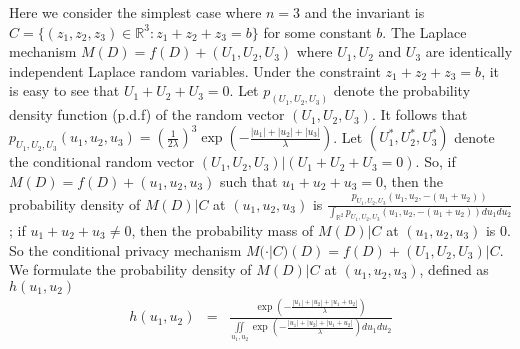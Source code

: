 \documentclass[11pt]{article}
\begin{document}
\begin{comment}
Here we demonstrate a form of mechanism design.  For simplicity, we assume that $M: \mathcal{D}\rightarrow \mathbb{R}^n$ is additive, i.e., $M(D)= f(D) + (U_1, U_2,\cdots, U_n) $ where $U_i's$ are i.i.d. random variables with density function $f_{U_i}$. The $M(D|C) = f(D) + (U_1, U_2, \cdots, U_n) |C$ where $(U_1, U_2, \cdots, U_n)|C $ is a random vector with the density function as follows:

\begin{equation*}
f_{(U_1, U_2, \cdots, U_n)|C} = \left\{
\begin{array}{rl}
\frac{f_{(U_1, U_2, \cdots, U_n)}}{K} & \text{if } M(D) \in C,\\
 0 & \text{if } otherwise.
\end{array} \right.
\end{equation*}
where $K = \int_C f_{(U_1, U_2, \cdots, U_n)} (u_1, u_2, \cdots, u_n) du_1u_2\cdots u_n$.
\end{comment}
 
Here we consider the simplest case where $n=3$ and the invariant is $C=\{(z_1,z_2,z_3)\in \mathbb{R}^3: z_1+ z_2 + z_3=b\}$ for some constant $b$.  The Laplace mechanism $M(D) = f(D) + (U_1, U_2, U_3)$ where $U_1, U_2$ and $U_3$ are identically independent Laplace random variables. Under the constraint  $z_1 + z_2 +z_3= b$, it is easy to see that $U_1+U_2+U_3=0$.
Let $p_{(U_1, U_2, U_3)}$ denote the probability density function (p.d.f) of the random vector $(U_1, U_2, U_3)$. It follows that $p_{U_1, U_2, U_3}(u_1, u_2, u_3) = (\frac{1}{2\lambda})^3 \exp(-\frac{|u_1| + |u_2| +|u_3|}{\lambda})$. Let $(U^*_1, U^*_2, U^*_3)$ denote the conditional random vector $(U_1, U_2, U_3) | (U_1+U_2 +U_3 =0)$.  So, if $M(D) = f(D) + (u_1,u_2,u_3)$ such that $u_1+u_2+u_3=0$, then the probability density of $M(D)|C$ at $(u_1,u_2,u_3)$ is
$\frac{p_{U_1, U_2, U_3}(u_1, u_2, -(u_1+u_2))}{\int_{\mathbb{R}^2}p_{U_1, U_2, U_3}(u_1, u_2, -(u_1+u_2)) du_1du_2}$; if $u_1+u_2+u_3 \neq 0$, then the probability mass of $M(D)|C$ at $(u_1,u_2, u_3)$ is 0.  So the conditional privacy mechanism $M(\cdot | C)(D) = f(D) + (U_1, U_2, U_3) |C$. We formulate the probability density of $M(D)|C$ at $(u_1,u_2,u_3)$, defined as $h\left(u_1,u_2\right)$
\begin{eqnarray*}
h\left(u_1,u_2\right)
  &=&\frac{\exp \left(-\frac{|u_1|+|u_2|+|u_1+u_2|}{\lambda}\right)}{
  \underset{u_1,u_2}\iint \exp \left(-\frac{|u_1|+|u_2|+|u_1+u_2|}{\lambda}\right) d u_{1} d u_{2}}
\end{eqnarray*}
\end{document}
